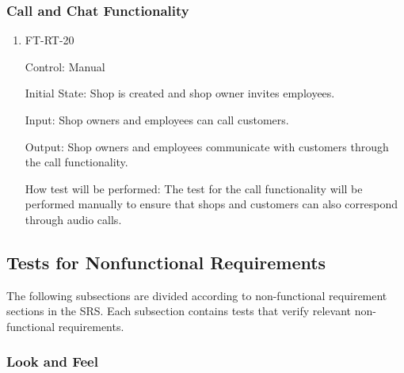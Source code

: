 \documentclass[12pt, titlepage]{article}
\begin{document}
\subsubsection{Call and Chat Functionality}

\begin{enumerate}
    \item{FT-RT-20\\}

Control: Manual

Initial State: Shop is created and shop owner invites employees.

Input: Shop owners and employees can call customers.

Output: Shop owners and employees communicate with customers through the call functionality.

How test will be performed: The test for the call functionality will be performed manually to ensure that shops and customers can also correspond through audio calls.
\end{enumerate}

\subsection{Tests for Nonfunctional Requirements}




The following subsections are divided according to non-functional requirement sections in the SRS. Each subsection contains tests that verify relevant non-functional requirements.

\subsubsection{Look and Feel}
		
\end{document}
